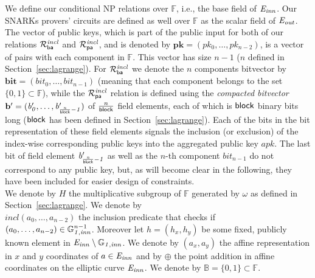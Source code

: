 \noindent We define our conditional NP relations over $\mathbb{F}$, i.e., the base field of $\mathit{E}_{\mathit{inn}}$. 
Our SNARKs provers' circuits are defined as well over $\mathbb{F}$ as the scalar field of $\mathit{E}_{\mathit{out}}$. The vector of public keys, which is part of the public input for both of our 
relations $\mathcal{R}^{\mathit{incl}}_{\mathsf{ba}}$ and $\mathcal{R}^{\mathit{incl}}_{\mathsf{pa}}$, and is denoted by $\mathbf{pk} = (\mathit{pk_0}, \ldots, \mathit{pk_{n-2}})$, is a vector of pairs with each component 
in $\mathbb{F}$. This vector has size $n-1$ ($n$ defined in 
Section~\ref{sec:lagrange}). For $\mathcal{R}^{\mathit{incl}}_{\mathsf{ba}}$ we denote 
the $n$ components bitvector by $\mathbf{bit} = (\mathit{bit_0}, \ldots, \mathit{bit_{n-1}})$ 
(meaning that each component belongs to the set $\{0,1\} \subset \mathbb{F}$), 
{\color{red} while the $\mathcal{R}^{\mathit{incl}}_{\mathsf{pa}}$ relation is defined using} the \emph{compacted bitvector} 
$\mathbf{b'} = (\mathit{b'_{0}}, \ldots, \mathit{b'_{\frac{n}{\mathsf{block}}-1}})$ of $\frac{n}{\mathsf{block}}$ field elements, 
each of which is $\mathsf{block}$ binary bits long ($\mathsf{block}$ has been defined in Section~\ref{sec:lagrange}). 
Each of the bits in the bit representation of these field elements signals the 
inclusion (or exclusion) of the index-wise corresponding public keys into the aggregated public key $\mathit{apk}$. The last bit of field element $\mathit{b'_{\frac{n}{\mathsf{block}}-1}}$ as well as the $n$-th component $\mathit{bit_{n-1}}$ do not correspond to any public key, 
but, as will become clear in the following, they have been included for easier design of constraints. \\ 
\vspace{-0.009in}
\noindent We denote by $H$ the multiplicative subgroup of $\mathbb{F}$ generated 
by $\omega$ as defined in Section~\ref{sec:lagrange}. We denote by \\ $\mathit{incl}(a_0, \ldots, a_{n-2})$ the inclusion 
predicate that checks if \\ $(a_0, \ldots, a_{n-2}) \in \mathbb{G}_{\mathit{1,inn}}^{n-1}$. Moreover let $h = (\mathit{h_x}, \mathit{h_y})$ 
be some fixed, publicly known element in $\mathit{E}_{\mathit{inn}} \setminus \mathbb{G}_{\mathit{1,inn}}$. We denote by $(a_x, a_y)$ the affine representation in 
$x$ and $y$ coordinates of $a \in \mathit{E}_{\mathit{inn}}$ and by $\oplus$ the point addition in affine coordinates on the elliptic curve $\mathit{E}_{\mathit{inn}}$. 
We denote by $\mathbb{B} = \{0,1\} \subset \mathbb{F}$. \\
\vspace{-0.15in}

\vspace{-0.1in}
